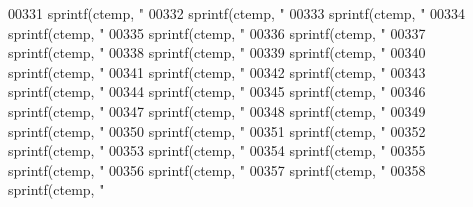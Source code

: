 \begin{DoxyCode}
{{{{{{{{{{{{{{{{{{{{{{{{{{{{{{{{{{{{{{{{{{{{{{{{{{{{{{{{{{{{{{{{{{{{{{{{{{{{{{{{{{{{{{{{{{{{{{{{{{{{{{{{{{{{{{{{{{{{{{{{{{{{{{{{{{{{{{{{{{{{{{{{{{{{{{{{{{{{{{{{{{{{{{{{{{{{{{{{{{{{{{{{{{{{{{{00331     sprintf(ctemp, \textcolor{stringliteral}{"%
00332     sprintf(ctemp, \textcolor{stringliteral}{"%
00333     sprintf(ctemp, \textcolor{stringliteral}{"%
00334     sprintf(ctemp, \textcolor{stringliteral}{"%
00335     sprintf(ctemp, \textcolor{stringliteral}{"%
00336     sprintf(ctemp, \textcolor{stringliteral}{"%
00337     sprintf(ctemp, \textcolor{stringliteral}{"%
00338     sprintf(ctemp, \textcolor{stringliteral}{"%
00339     sprintf(ctemp, \textcolor{stringliteral}{"%
00340     sprintf(ctemp, \textcolor{stringliteral}{"%
00341     sprintf(ctemp, \textcolor{stringliteral}{"%
00342     sprintf(ctemp, \textcolor{stringliteral}{"%
00343     sprintf(ctemp, \textcolor{stringliteral}{"%
00344     sprintf(ctemp, \textcolor{stringliteral}{"%
00345     sprintf(ctemp, \textcolor{stringliteral}{"%
00346     sprintf(ctemp, \textcolor{stringliteral}{"%
00347     sprintf(ctemp, \textcolor{stringliteral}{"%
00348     sprintf(ctemp, \textcolor{stringliteral}{"%
00349     sprintf(ctemp, \textcolor{stringliteral}{"%
00350     sprintf(ctemp, \textcolor{stringliteral}{"%
00351     sprintf(ctemp, \textcolor{stringliteral}{"%
00352     sprintf(ctemp, \textcolor{stringliteral}{"%
00353     sprintf(ctemp, \textcolor{stringliteral}{"%
00354     sprintf(ctemp, \textcolor{stringliteral}{"%
00355     sprintf(ctemp, \textcolor{stringliteral}{"%
00356     sprintf(ctemp, \textcolor{stringliteral}{"%
00357     sprintf(ctemp, \textcolor{stringliteral}{"%
00358     sprintf(ctemp, \textcolor{stringliteral}{"%
}}}}}}}}}}}}}}}}}}}}}}}}}}}}}}}}}}}}}}}}}}}}}}}}}}}}}}}}}}}}}}}}}}}}}}}}}}}}}}}}}}}}}}}}}}}}}}}}}}}}}}}}}}}}}}}}}}}}}}}}}}}}}}}}}}}}}}}}}}}}}}}}}}}}}}}}}}}}}}}}}}}}}}}}}}}}}}}}}}}}}}}}}}}}}}}}}}}}}}}}}}}}}}}}}}}}}}}}}}}
\end{DoxyCode}
